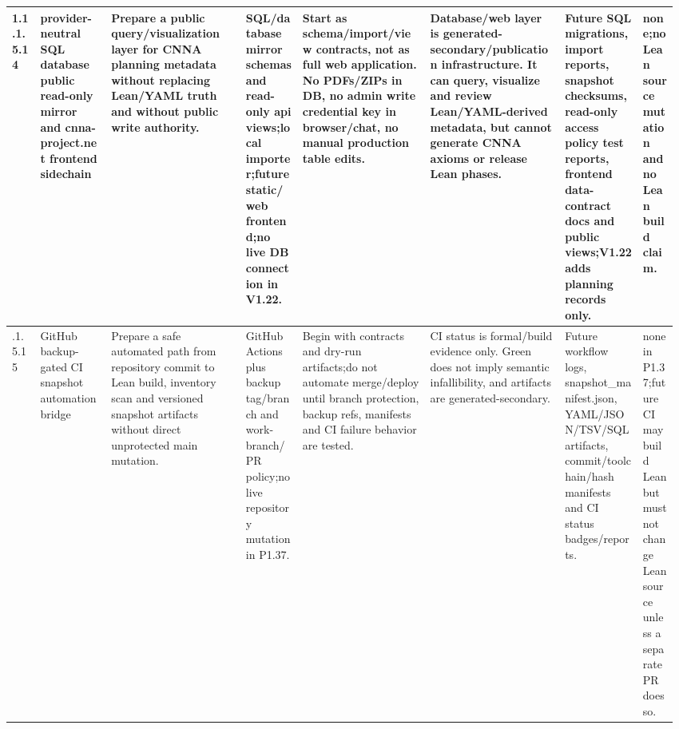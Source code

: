 \begin{longtable}{L{0.042\linewidth} L{0.105\linewidth} L{0.195\linewidth} L{0.08\linewidth} L{0.185\linewidth} L{0.19\linewidth} L{0.118\linewidth} L{0.055\linewidth}}
1.1.1.5.14 & provider-neutral SQL database public read-only mirror and cnna-project.net frontend sidechain & Prepare a public query/\allowbreak{}visualization layer for CNNA planning metadata without replacing Lean/\allowbreak{}YAML truth and without public write authority. & SQL/\allowbreak{}database mirror schemas and read-only api views;\newline local importer;\newline future static/\allowbreak{}web frontend;\newline no live DB connection in V1.22. & Start as schema/\allowbreak{}import/\allowbreak{}view contracts, not as full web application. No PDFs/\allowbreak{}ZIPs in DB, no admin write credential key in browser/\allowbreak{}chat, no manual production table edits. & Database/\allowbreak{}web layer is generated-secondary/\allowbreak{}publication infrastructure. It can query, visualize and review Lean/\allowbreak{}YAML-derived metadata, but cannot generate CNNA axioms or release Lean phases. & Future SQL migrations, import reports, snapshot checksums, read-only access policy test reports, frontend data-contract docs and public views;\newline V1.22 adds planning records only. & none;\newline no Lean source mutation and no Lean build claim.\\
\hline
{}.1.5.15 & GitHub backup-gated CI snapshot automation bridge & Prepare a safe automated path from repository commit to Lean build, inventory scan and versioned snapshot artifacts without direct unprotected main mutation. & GitHub Actions plus backup tag/\allowbreak{}branch and work-branch/\allowbreak{}PR policy;\newline no live repository mutation in P1.37. & Begin with contracts and dry-run artifacts;\newline do not automate merge/\allowbreak{}deploy until branch protection, backup refs, manifests and CI failure behavior are tested. & CI status is formal/\allowbreak{}build evidence only. Green does not imply semantic infallibility, and artifacts are generated-secondary. & Future workflow logs, snapshot\_manifest.json, YAML/\allowbreak{}JSON/\allowbreak{}TSV/\allowbreak{}SQL artifacts, commit/\allowbreak{}toolchain/\allowbreak{}hash manifests and CI status badges/\allowbreak{}reports. & none in P1.37;\newline future CI may build Lean but must not change Lean source unless a separate PR does so.\\

\end{longtable}
